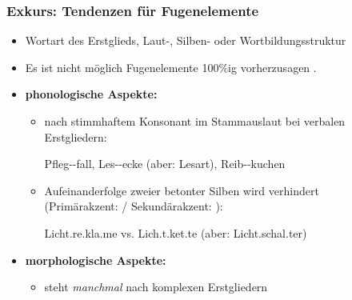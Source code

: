 \begin{frame}
\frametitle{Exkurs: Tendenzen für Fugenelemente}

\begin{itemize}
	\item Wortart des Erstglieds, Laut-, Silben- oder Wortbildungsstruktur 
	
	\item Es ist nicht möglich Fugenelemente 100\%ig vorherzusagen \citep[vgl.][]{Fuhrhop96a}.

\pause
	
	\item \textbf{phonologische Aspekte:}
	
	\begin{itemize}
		\item \textipa{[@]} nach stimmhaftem Konsonant im Stammauslaut bei verbalen Erstgliedern:
		
		\ea Pfleg--fall, Les--ecke (aber: Lesart), Reib--kuchen
		\z
		
		\item Aufeinanderfolge zweier betonter Silben wird verhindert\\
		(Primärakzent: \textprimstress / Sekundärakzent: \textsecstress):
		
		\ea \textprimstress Licht\alertred{\_}.re.\textsecstress kla.me vs. \textprimstress Lich.t.\textsecstress ket.te (aber: \textprimstress Licht\alertred{\_}.\textsecstress schal.ter)
		\z
			
	\end{itemize}

\pause 

	\item \textbf{morphologische Aspekte:}
	
	\begin{itemize}
		\item {} steht \emph{manchmal} nach komplexen Erstgliedern

		\z 
	\end{itemize}

\end{itemize}

\end{frame}


